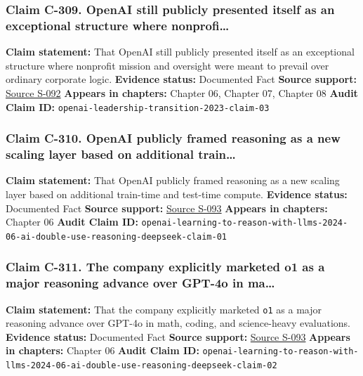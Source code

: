 \documentclass[
  american,
  11pt,
  letterpaper,
]{article}
\begin{document}
\subsubsection{Claim C-309. OpenAI still publicly presented itself as an
exceptional structure where
nonprofi\ldots{}}\label{claim-c-309-openai-still-publicly-presented-itself-as-an-exceptional-structure-where-nonprofi}

\textbf{Claim statement:} That OpenAI still publicly presented itself as
an exceptional structure where nonprofit mission and oversight were
meant to prevail over ordinary corporate logic. \textbf{Evidence
status:} Documented Fact \textbf{Source support:}
\hyperref[source-s-092-openai-announces-leadership-transition]{Source
S-092} \textbf{Appears in chapters:} Chapter 06, Chapter 07, Chapter 08
\textbf{Audit Claim ID:}
\texttt{openai-leadership-transition-2023-claim-03}

\subsubsection{Claim C-310. OpenAI publicly framed reasoning as a new
scaling layer based on additional
train\ldots{}}\label{claim-c-310-openai-publicly-framed-reasoning-as-a-new-scaling-layer-based-on-additional-train}

\textbf{Claim statement:} That OpenAI publicly framed reasoning as a new
scaling layer based on additional train-time and test-time compute.
\textbf{Evidence status:} Documented Fact \textbf{Source support:}
\hyperref[source-s-093-learning-to-reason-with-llms]{Source S-093}
\textbf{Appears in chapters:} Chapter 06 \textbf{Audit Claim ID:}
\texttt{openai-learning-to-reason-with-llms-2024-06-ai-double-use-reasoning-deepseek-claim-01}

\subsubsection{Claim C-311. The company explicitly marketed o1 as a
major reasoning advance over GPT-4o in
ma\ldots{}}\label{claim-c-311-the-company-explicitly-marketed-o1-as-a-major-reasoning-advance-over-gpt-4o-in-ma}

\textbf{Claim statement:} That the company explicitly marketed
\texttt{o1} as a major reasoning advance over GPT-4o in math, coding,
and science-heavy evaluations. \textbf{Evidence status:} Documented Fact
\textbf{Source support:}
\hyperref[source-s-093-learning-to-reason-with-llms]{Source S-093}
\textbf{Appears in chapters:} Chapter 06 \textbf{Audit Claim ID:}
\texttt{openai-learning-to-reason-with-llms-2024-06-ai-double-use-reasoning-deepseek-claim-02}
\end{document}
